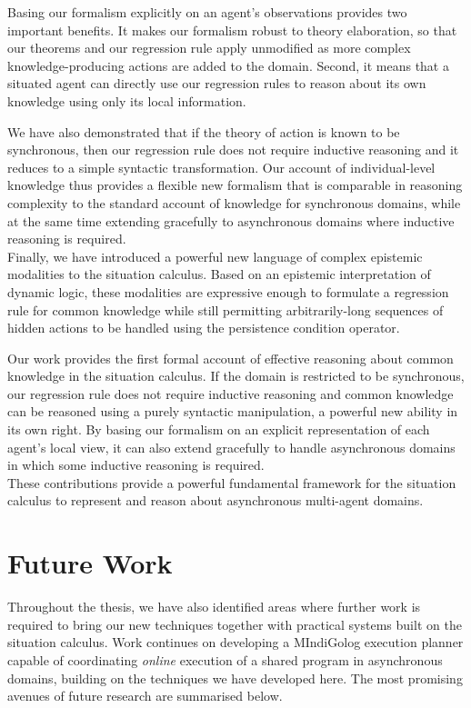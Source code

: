 Basing our formalism explicitly on an agent's observations provides
two important benefits. It makes our formalism robust to theory elaboration,
so that our theorems and our regression rule apply unmodified as more
complex knowledge-producing actions are added to the domain. Second,
it means that a situated agent can directly use our regression rules
to reason about its own knowledge using only its local information.

We have also demonstrated that if the theory of action is known to
be synchronous, then our regression rule does not require inductive
reasoning and it reduces to a simple syntactic transformation. Our
account of individual-level knowledge thus provides a flexible new
formalism that is comparable in reasoning complexity to the standard
account of knowledge for synchronous domains, while at the same time
extending gracefully to asynchronous domains where inductive reasoning
is required.\\


Finally, we have introduced a powerful new language of complex epistemic
modalities to the situation calculus. Based on an epistemic interpretation
of dynamic logic, these modalities are expressive enough to formulate
a regression rule for common knowledge while still permitting arbitrarily-long
sequences of hidden actions to be handled using the persistence condition
operator.

Our work provides the first formal account of effective reasoning
about common knowledge in the situation calculus. If the domain is
restricted to be synchronous, our regression rule does not require
inductive reasoning and common knowledge can be reasoned using a purely
syntactic manipulation, a powerful new ability in its own right. By
basing our formalism on an explicit representation of each agent's
local view, it can also extend gracefully to handle asynchronous domains
in which some inductive reasoning is required.\\


These contributions provide a powerful fundamental framework for the
situation calculus to represent and reason about asynchronous multi-agent
domains.


\section{Future Work}

Throughout the thesis, we have also identified areas where further
work is required to bring our new techniques together with practical
systems built on the situation calculus. Work continues on developing
a MIndiGolog execution planner capable of coordinating \emph{online}
execution of a shared program in asynchronous domains, building on
the techniques we have developed here. The most promising avenues
of future research are summarised below.

